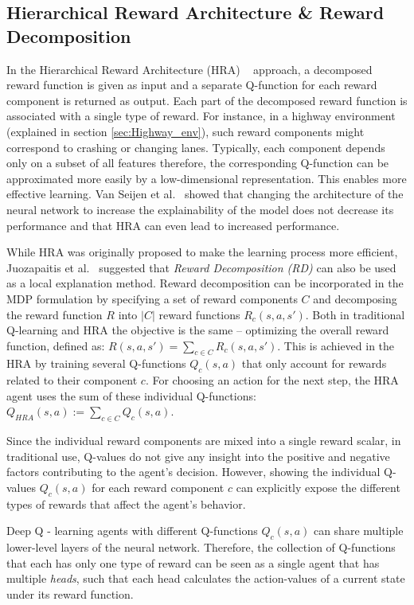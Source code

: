 \documentclass{ecai}
\begin{document}
\subsection{Hierarchical Reward Architecture \& Reward Decomposition}
\label{sec:RD}
In the Hierarchical Reward Architecture (HRA) ~\cite{van2017hybrid} approach, a decomposed reward function is given as input and a separate Q-function for each reward component is returned as output. Each part of the decomposed reward function is associated with a single type of reward. For instance, in a highway environment (explained in section \ref{sec:Highway_env}), such reward components might correspond to crashing or changing lanes.
Typically, each component depends only on a subset of all features therefore, the corresponding Q-function can be approximated more easily by a low-dimensional representation. This enables more effective learning.
Van Seijen et al.~\cite{van2017hybrid} showed that changing the architecture of the neural network to increase the explainability of the model does not decrease its performance and that HRA can even lead to increased performance.

While HRA was originally proposed to make the learning process more efficient, Juozapaitis et al.~\cite{juozapaitis2019explainable} suggested that \emph{Reward Decomposition (RD)} can also be used as a local explanation method. Reward decomposition can be incorporated in the MDP formulation by specifying a set of reward components $C$ and decomposing the reward function $R$ into $|C|$ reward functions $R_c(s,a,s')$. 
Both in traditional Q-learning and HRA the objective is the same -- optimizing the overall reward function, defined as: $R(s,a,s') = \sum_{c \in C}R_c(s,a,s')$.
This is achieved in the HRA by training several Q-functions $Q_{c}(s,a)$ that only account for rewards related to their component $c$.
For choosing an action for the next step, the HRA agent uses the sum of these individual Q-functions: $Q_{HRA}(s,a):= \sum_{c \in C} Q_c(s,a)$.

Since the individual reward components are mixed into a single reward scalar, in traditional use, Q-values do not give any insight into the positive and negative factors contributing to the agent's decision.
However, showing the individual Q-values $Q_{c}(s,a)$ for each reward component $c$ can explicitly expose the different types of rewards that affect the agent's behavior.

Deep Q - learning agents with different Q-functions $Q_{c}(s,a)$ can share multiple lower-level layers of the neural network.
Therefore, the collection of Q-functions that each has only one type of reward can be seen as a single agent that has multiple \emph{heads}, such that each head calculates the action-values of a current state under its reward function.
\end{document}
